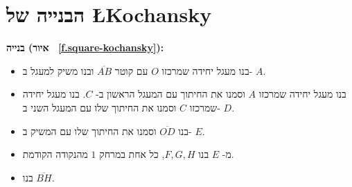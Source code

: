 


\section{הבנייה של
\L{Kochansky}}\label{s.square-kochanski}

\textbf{%
בנייה (איור%
~\ref{f.square-kochansky}):}
\begin{itemize}
\item
בנו מעגל יחידה שמרכזו 
$O$
עם קוטר
$\overline{AB}$
ובנו משיק למעגל ב-%
$A$.
\item
בנו מעגל יחידה שמרכזו
$A$
וסמנו את החיתוך עם המעגל הראשון ב-%
$C$.
בנו מעגל יחידה שמרכזו 
$C$
וסמנו את החיתוך שלו עם המעגל השני ב-%
$D$. 
\item
בנו
$\overline{OD}$
וסמנו את החיתוך שלו עם המשיק ב-%
$E$.
\item
מ-%
$E$
בנו
$F,G,H$,
כל אחת במרחק 
$1$
מהנקודה הקודמת.
\item
בנו
$\overline{BH}$.
\end{itemize}

